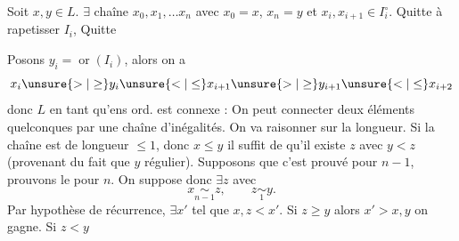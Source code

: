 
Soit $x,y\in L$. $\exists$ chaîne $x_0,x_1,\ldots x_n$ avec $x_0=x$, $x_n=y$ et $x_i,x_{i+1}\in I_i^\circ$.  Quitte à rapetisser $I_i$,  Quitte

Posons $y_i=\operatorname{or}(I_i)$, alors on a
\[
x_i\unsure{>|\geq}y_i\unsure{<|\leq}x_{i+1}
\unsure{>|\geq}y_{i+1}\unsure{<|\leq}x_{i+2}
\]
donc $L$ en tant qu'ens ord. est connexe : On peut connecter deux éléments quelconques par une chaîne d'inégalités. On va raisonner sur la longueur. Si la chaîne est de longueur $\leq1$, donc $x\leq y$ il suffit de   qu'il existe $z$ avec $y<z$ (provenant du fait que $y$ régulier). Supposons que c'est prouvé pour $n-1$,  prouvons le pour $n$.  On suppose donc $\exists z$ avec
\[
x\underset{n-1}{\sim}z,\qquad z\underset{1}{\sim}y.
\]
Par hypothèse de récurrence, $\exists x'$ tel que  $x,z<x'$. Si $z\geq y$ alors $x'>x,y$ on gagne. Si $z<y$ 


